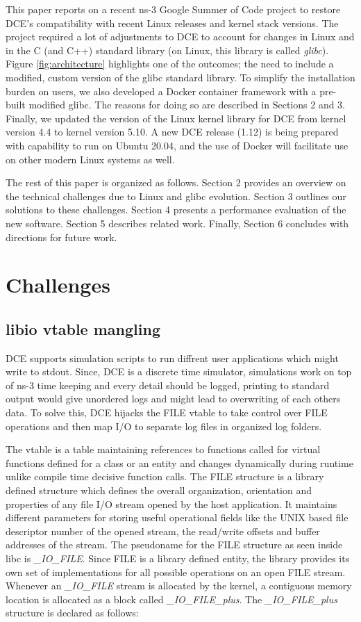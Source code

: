 \documentclass{sig-alternate}
\begin{document}
This paper reports on a recent ns-3 Google Summer of Code project to restore
DCE's compatibility with
recent Linux releases and kernel stack versions.  The project required
a lot of adjustments to DCE to account for changes in Linux and in the
C (and C++) standard library (on Linux, this library is called \emph{glibc}).
Figure \ref{fig:architecture} highlights one of the outcomes; the need to
include a modified, custom version of the glibc standard library.  To
simplify the installation burden on users, we also developed a Docker
container framework with a pre-built modified glibc.  The reasons for
doing so are described in Sections 2 and 3.  Finally, we updated the
version of the Linux kernel library for DCE from kernel version 4.4 
to kernel version 5.10.  A new DCE release (1.12) is being prepared with
capability to run on Ubuntu 20.04, and the use of Docker will facilitate
use on other modern Linux systems as well.

The rest of this paper is organized as follows.  Section 2 provides an
overview on the technical challenges due to Linux and glibc evolution.
Section 3 outlines our solutions to these challenges.
Section 4 presents a performance evaluation of the new software.
Section 5 describes related work.
Finally, Section 6 concludes with directions for future work.

\section{Challenges}

\subsection{libio vtable mangling}
DCE supports simulation scripts to run diffrent user applications which might write to stdout. Since, DCE is a discrete time simulator, simulations work on top of 
ns-3 time keeping and every detail should be logged, printing to standard output would give unordered logs and might lead to overwriting of each others data. 
To solve this, DCE hijacks the FILE vtable to take control over FILE operations and then map I/O to separate log files in organized log folders.

The vtable is a table maintaining references to functions called for virtual functions defined for a class or an entity and changes dynamically 
during runtime unlike compile time decisive function calls. The FILE structure is a library defined structure which defines the overall organization, 
orientation and properties of any file I/O stream opened
by the host application. It maintains different parameters for storing useful operational fields like the UNIX based file descriptor number of the 
opened stream, the read/write offsets and buffer addresses of the stream. The pseudoname for the FILE structure as seen inside libc is \textit{\_IO\_FILE}. 
Since FILE is a library defined entity, the library provides its own set of implementations for all possible operations on an open FILE stream.
Whenever an \textit{\_IO\_FILE} stream is allocated by the kernel, a contiguous memory location is allocated as a block called \textit{\_IO\_FILE\_plus}. 
The \textit{\_IO\_FILE\_plus} structure is declared as follows:
\end{document}

